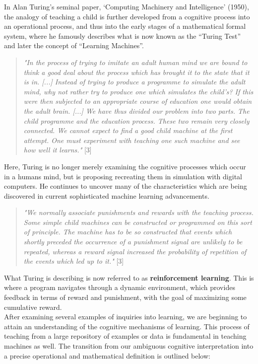 \documentclass[12pt]{article}
\begin{document}
\noindent
In Alan Turing's seminal paper, `Computing Machinery and Intelligence' (1950), the analogy of teaching a child is further developed from a cognitive process into an operational process, and thus into the early stages of a mathematical formal system, where he famously describes what is now known as the ``Turing Test'' and later the concept of ``Learning Machines''.
\begin{quotation}
\noindent
\textit{
"In the process of trying to imitate an adult human mind we are bound to think a good deal about the process which has brought it to the state that it is in. [...] Instead of trying to produce a programme to simulate the adult mind, why not rather try to produce one which simulates the child's? If this were then subjected to an appropriate course of education one would obtain the adult brain. [...] We have thus divided our problem into two parts. The child programme and the education process. These two remain very closely connected. We cannot expect to find a good child machine at the first attempt. One must experiment with teaching one such machine and see how well it learns."} [3]

\end{quotation}
Here, Turing is no longer merely examining the cognitive processes which occur in a humans mind, but is proposing recreating them in simulation with digital computers. He continues to uncover many of the characteristics which are being discovered in current sophisticated machine learning advancements.

\begin{quotation}
\noindent
\textit{
"We normally associate punishments and rewards with the teaching process. Some simple child machines can be constructed or programmed on this sort of principle. The machine has to be so constructed that events which shortly preceded the occurrence of a punishment signal are unlikely to be repeated, whereas a reward signal increased the probability of repetition of the events which led up to it."} [3]

\end{quotation}
What Turing is describing is now referred to as \textbf{reinforcement learning}. This is where a program navigates through a dynamic environment, which provides feedback in terms of reward and punishment, with the goal of maximizing some cumulative reward. 
\\

\noindent
After examining several examples of inquiries into learning, we are beginning to attain an understanding of the cognitive mechanisms of learning. This process of teaching from a large repository of examples or data is fundamental in teaching machines as well. The transition from our ambiguous cognitive interpretation into a precise operational and mathematical definition is outlined below: 
\end{document}
